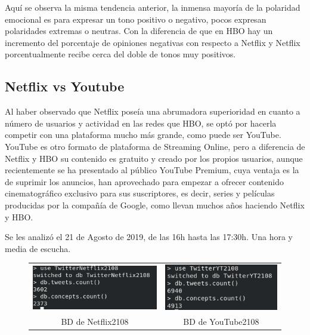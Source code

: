 Aquí se observa la misma tendencia anterior, la inmensa mayoría de la polaridad emocional es para expresar un tono positivo o negativo, pocos expresan polaridades extremas o neutras. Con la diferencia de que en HBO hay un incremento del porcentaje de opiniones negativas con respecto a Netflix y Netflix porcentualmente recibe cerca del doble de tonos muy positivos. 


\subsection{Netflix vs Youtube}

Al haber observado que Netflix poseía una abrumadora superioridad en cuanto a número de usuarios y actividad en las redes que HBO, se optó por hacerla competir con una plataforma mucho más grande, como puede ser YouTube. YouTube es otro formato de plataforma de Streaming Online, pero a diferencia de Netflix y HBO su contenido es gratuito y creado por los propios usuarios, aunque recientemente se ha presentado al público YouTube Premium, cuya ventaja es la de suprimir los anuncios, han aprovechado para empezar a ofrecer contenido cinematográfico exclusivo para sus suscriptores, es decir, series y películas producidas por la compañía de Google, como llevan muchos años haciendo Netflix y HBO. 

Se les analizó el 21 de Agosto de 2019, de las 16h hasta las 17:30h. Una hora y media de escucha.


 
 \begin{figure}[H]
 	\centering
 	\begin{tabular}{c c}
 		
 		\includegraphics[scale=.7]{imagenes/Netflix2108Mongo.png}
 		&  \includegraphics[scale=.7]{imagenes/YT2108Mongo.png} \\ 
 		
 		{BD de Netflix2108}
 		
 		&  {BD de YouTube2108} \\ 
 		
 	\end{tabular} 
 	\label{fig:Mongo2108}
 \end{figure}


